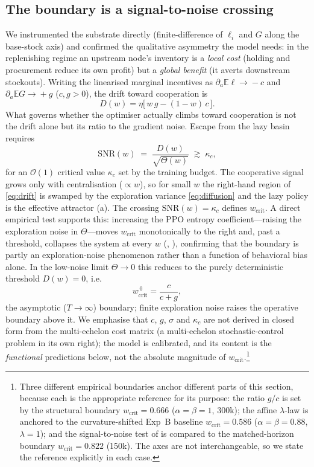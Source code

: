 \documentclass[11pt]{article}
\newcommand{\wcrit}{w_{\mathrm{crit}}}
\begin{document}
\subsection{The boundary is a signal-to-noise crossing}
We instrumented the substrate directly (finite-difference of $\ell_i$ and
$G$ along the base-stock axis) and confirmed the qualitative asymmetry the
model needs: in the replenishing regime an upstream node's inventory is a
\emph{local cost} (holding and procurement reduce its own profit) but a
\emph{global benefit} (it averts downstream stockouts). Writing the
linearised marginal incentives as $\partial_a\mathbb{E}\ell\!\to\!-c$ and
$\partial_a\mathbb{E}G\!\to\!+g$ ($c,g>0$), the drift toward cooperation is
\begin{equation}
  D(w)=\eta\big[\,w\,g-(1-w)\,c\,\big].
  \label{eq:drift}
\end{equation}
What governs whether the optimiser actually climbs toward cooperation is
not the drift alone but its ratio to the gradient noise. Escape from the
lazy basin requires
\begin{equation}
  \mathrm{SNR}(w)\;=\;\frac{D(w)}{\sqrt{\Theta(w)}}\;\gtrsim\;\kappa_c ,
  \label{eq:snr}
\end{equation}
for an $\mathcal{O}(1)$ critical value $\kappa_c$ set by the training
budget. The cooperative signal grows only with centralisation
($\propto w$), so for small $w$ the right-hand region of \eqref{eq:drift}
is swamped by the exploration variance \eqref{eq:diffusion} and the lazy
policy is the effective attractor (a). The crossing
$\mathrm{SNR}(w)=\kappa_c$ defines $\wcrit$. A direct empirical test supports
this: increasing the PPO entropy coefficient---raising the exploration noise
in $\Theta$---moves $\wcrit$ monotonically to the right and, past a threshold,
collapses the system at every $w$ (,
), confirming that the boundary is partly an
exploration-noise phenomenon rather than a function of behavioral bias alone. In the low-noise limit
$\Theta\!\to\!0$ this reduces to the purely deterministic threshold
$D(w)=0$, i.e.
\begin{equation}
  \wcrit^{\,0}=\frac{c}{c+g},
  \label{eq:wcrit}
\end{equation}
the asymptotic ($T\!\to\!\infty$) boundary; finite exploration noise raises
the operative boundary above it. We emphasise that $c$, $g$, $\sigma$ and
$\kappa_c$ are not derived in closed form from the multi-echelon cost
matrix (a multi-echelon stochastic-control problem in its own right); the
model is calibrated, and its content is the \emph{functional} predictions
below, not the absolute magnitude of $\wcrit$.\footnote{%
  Three different empirical boundaries anchor different parts of this
  section, because each is the appropriate reference for its purpose: the
  ratio $g/c$ is set by the structural boundary $\wcrit{=}0.666$
  ($\alpha{=}\beta{=}1$, 300k); the affine $\lambda$-law is anchored to the
  curvature-shifted Exp~B baseline $\wcrit{=}0.586$ ($\alpha{=}\beta{=}0.88$,
  $\lambda{=}1$); and the signal-to-noise test of 
  is compared to the matched-horizon boundary $\wcrit{=}0.822$ (150k). The
  axes are not interchangeable, so we state the reference explicitly in each
  case.}
\end{document}
